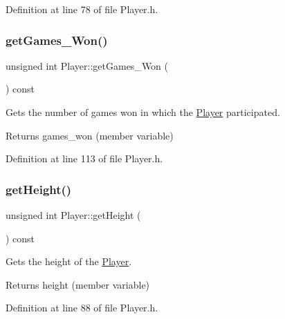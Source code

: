 Definition at line 78 of file Player.\+h.

\hypertarget{class_player_a0a7205a9a0a7b9b6bf02035ee104b690}{}\label{class_player_a0a7205a9a0a7b9b6bf02035ee104b690} 
\subsubsection{\texorpdfstring{get\+Games\+\_\+\+Won()}{getGames\_Won()}}
{\footnotesize\ttfamily unsigned int Player\+::get\+Games\+\_\+\+Won (\begin{DoxyParamCaption}{ }\end{DoxyParamCaption}) const\hspace{0.3cm}{\ttfamily [inline]}}



Gets the number of games won in which the \hyperlink{class_player}{Player} participated. 

\begin{DoxyReturn}{Returns}
games\+\_\+won (member variable) 
\end{DoxyReturn}


Definition at line 113 of file Player.\+h.

\hypertarget{class_player_a35448f9c66824c2adfc643245758ce37}{}\label{class_player_a35448f9c66824c2adfc643245758ce37} 
\subsubsection{\texorpdfstring{get\+Height()}{getHeight()}}
{\footnotesize\ttfamily unsigned int Player\+::get\+Height (\begin{DoxyParamCaption}{ }\end{DoxyParamCaption}) const\hspace{0.3cm}{\ttfamily [inline]}}



Gets the height of the \hyperlink{class_player}{Player}. 

\begin{DoxyReturn}{Returns}
height (member variable) 
\end{DoxyReturn}


Definition at line 88 of file Player.\+h.

\hypertarget{class_player_ae769d5edba7c2a1defb0d53efe5804a4}{}\label{class_player_ae769d5edba7c2a1defb0d53efe5804a4} 
